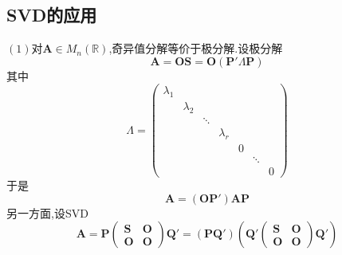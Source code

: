 \subsection{SVD的应用}
$(1)$对$\bm{A}\in M_n\left(\mathbb{R}\right)$,奇异值分解等价于极分解.设极分解\[
\bm{A}=\bm{OS}=\bm{O}\left(
    \bm{P}'\bm{\varLambda}\bm{P}
\right)
\]其中\[
\bm{\varLambda}=\begin{pmatrix}
    \lambda_1&&&&&&\\
    &\lambda_2&&&&&\\
    &&\ddots&&&&\\
    &&&\lambda_r&&&\\
    &&&&0&&\\
    &&&&&\ddots&\\
    &&&&&&0
\end{pmatrix}
\]于是\[
\bm{A}=\left(
    \bm{OP}'
\right)\bm{AP}
\]
另一方面,设SVD\[
\bm{A}=\bm{P}\begin{pmatrix}
    \bm{S}&\bm{O}\\
    \bm{O}&\bm{O}
\end{pmatrix}\bm{Q}'=\left(
    \bm{PQ}'
\right)\left(
    \bm{Q}'\begin{pmatrix}
        \bm{S}&\bm{O}\\
        \bm{O}&\bm{O}
    \end{pmatrix}\bm{Q}'
\right)
\]

